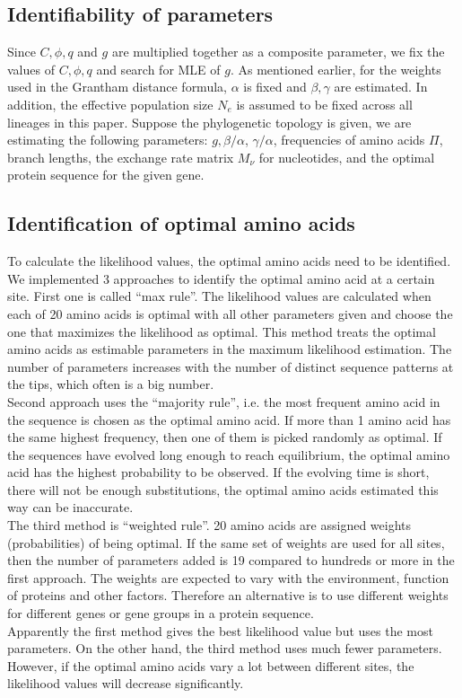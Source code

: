 \subsection{Identifiability of parameters}
Since $C, \phi, q$ and $g$ are multiplied together as a composite parameter, we fix the values of $C, \phi, q$ and search for MLE of $g$.
As mentioned earlier, for the weights used in the Grantham distance formula, $\alpha$ is fixed and $\beta, \gamma$ are estimated.
In addition, the effective population size $N_e$ is assumed to be fixed across all lineages in this paper.
Suppose the phylogenetic topology is given, we are estimating the following parameters: $g, \beta/\alpha$, $\gamma/\alpha$, frequencies of amino acids $\Pi$, branch lengths, the exchange rate matrix $M_\nu$ for nucleotides, and the optimal protein sequence for the given gene. 

\subsection{Identification of optimal amino acids}
To calculate the likelihood values, the optimal amino acids need to be identified.
We implemented 3 approaches to identify the optimal amino acid at a certain site.
First one is called ``max rule''.
The likelihood values are calculated when each of 20 amino acids is optimal with all other parameters given and choose the one that maximizes the likelihood as optimal.
This method treats the optimal amino acids as estimable parameters in the maximum likelihood estimation.
The number of parameters increases with the number of distinct sequence patterns at the tips, which often is a big number. \\
Second approach uses the ``majority rule'', i.e. the most frequent amino acid in the sequence is chosen as the optimal amino acid.
If more than 1 amino acid has the same highest frequency, then one of them is picked randomly as optimal.
If the sequences have evolved long enough to reach equilibrium, the optimal amino acid has the highest probability to be observed.
If the evolving time is short, there will not be enough substitutions, the optimal amino acids estimated this way can be inaccurate. \\
The third method is ``weighted rule''. 20 amino acids are assigned weights (probabilities) of being optimal.
If the same set of weights are used for all sites, then the number of parameters added is 19 compared to hundreds or more in the first approach.
The weights are expected to vary with the environment, function of proteins and other factors.
Therefore an alternative is to use different weights for different genes or gene groups in a protein sequence. \\
Apparently the first method gives the best likelihood value but uses the most parameters.
On the other hand, the third method uses much fewer parameters.
However, if the optimal amino acids vary a lot between different sites, the likelihood values will decrease significantly.\\

